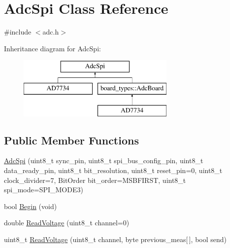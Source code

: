 \hypertarget{classAdcSpi}{}\section{Adc\+Spi Class Reference}
\label{classAdcSpi}


{\ttfamily \#include $<$adc.\+h$>$}

Inheritance diagram for Adc\+Spi\+:\begin{figure}[H]
\begin{center}
\leavevmode
\includegraphics[height=3.000000cm]{classAdcSpi}
\end{center}
\end{figure}
\subsection*{Public Member Functions}
\begin{DoxyCompactItemize}
\item 
\mbox{\hyperlink{classAdcSpi_a78b3bf970d85febda92dd343cca687a1}{Adc\+Spi}} (uint8\+\_\+t sync\+\_\+pin, uint8\+\_\+t spi\+\_\+bus\+\_\+config\+\_\+pin, uint8\+\_\+t data\+\_\+ready\+\_\+pin, uint8\+\_\+t bit\+\_\+resolution, uint8\+\_\+t reset\+\_\+pin=0, uint8\+\_\+t clock\+\_\+divider=7, Bit\+Order bit\+\_\+order=M\+S\+B\+F\+I\+R\+ST, uint8\+\_\+t spi\+\_\+mode=S\+P\+I\+\_\+\+M\+O\+D\+E3)
\item 
bool \mbox{\hyperlink{classAdcSpi_aa8f8f27578dd85cfcdbc9439bbce66cb}{Begin}} (void)
\item 
double \mbox{\hyperlink{classAdcSpi_ace8264acfedb357986afa5f611eff3ee}{Read\+Voltage}} (uint8\+\_\+t channel=0)
\item 
uint8\+\_\+t \mbox{\hyperlink{classAdcSpi_ac9d2ab924ad4de5b91713a22189f2ad0}{Read\+Voltage}} (uint8\+\_\+t channel, byte previous\+\_\+meas\mbox{[}$\,$\mbox{]}, bool send)
\end{DoxyCompactItemize}
